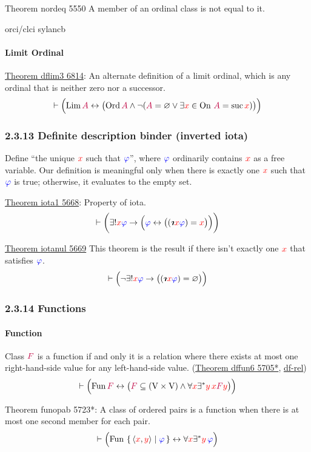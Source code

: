 \documentclass[12pt, letterpaper]{article}
\newcommand{\red}[1]{{\color{red} #1}}
\newcommand{\blue}[1]{{\color{blue} #1}}
\newcommand{\purple}[1]{{\color{purple} #1}}
\renewcommand{\emptyset}{\varnothing}
\newcommand{\provable}{\vdash}
\newcommand{\ra}{\rightarrow}
\newcommand{\lra}{\leftrightarrow}
\newcommand{\setvar}{\red}
\newcommand{\wff}{\blue}
\newcommand{\classvar}{\purple}
\newcommand{\wffphi}{\wff{\varphi}}
\newcommand{\sx}{\setvar{x}}
\newcommand{\sy}{\setvar{y}}
\newcommand{\clA}{\classvar{A}}
\newcommand{\clF}{\classvar{F}}
\newcommand{\VV}{\mathrm{V}}
\newcommand{\unique}{\exists^*}
\newcommand{\rotiota}[2]{\rotatebox[origin=c]{180}{$#1\boldsymbol{\iota}$}}
\newcommand{\iiota}{{\mathpalette\rotiota\relax}}
\newcommand{\defdes}{\iiota}
\newcommand{\Fun}{{\operatorname{Fun}\,}}
\newcommand{\Ord}{{\operatorname{Ord}\,}}
\newcommand{\suc}{{\operatorname{suc}\,}}
\newcommand{\Lim}{{\operatorname{Lim}\,}}
\newcommand{\On}{{\operatorname{On}\,}}
\newcommand{\opair}[2]{\left\langle{#1,#2}\right\rangle}
\theoremstyle{definition}
\theoremstyle{remark}
\theoremstyle{definition}
\theoremstyle{plain}
\begin{document}
	Theorem	nordeq 5550	A member of an ordinal class is not equal to it. 
	
	orci/clci
	sylancb
	\paragraph{Limit Ordinal}	
	\href{http://us.metamath.org/mpeuni/dflim3.html}
	{Theorem dflim3 6814}:
	An alternate definition of a limit ordinal, which is any ordinal that is neither zero nor a successor.
	\[\provable\Big(\Lim\clA\lra\big(\Ord\clA\land\neg(\clA=\emptyset
	\lor\exists\sx\in\On\,\clA=\suc\sx)\big)\Big) \]

	\subsubsection*{2.3.13  Definite description binder (inverted iota)}		
	
	Define ``the unique $\sx$ such that $\wffphi$'',
	where $\wffphi$ ordinarily contains $\sx$ as a free variable.
	Our definition is meaningful only when there is exactly one $\sx$
	such that $\wffphi$ is true;
	otherwise, it evaluates to the empty set.
	
	\href{http://us.metamath.org/mpeuni/iota1.html}{Theorem iota1 5668}:
	Property of iota.
	\[\provable\bigg(\exists!\sx\wffphi\ra\Big(\wffphi\lra\big((\defdes \sx\wffphi) = \sx\big)\Big)\bigg) \]
	
	\href{http://us.metamath.org/mpeuni/iotanul.html}{Theorem iotanul 5669}
	This theorem is the result if there isn't exactly one $\sx$
	that satisfies $\wffphi$.
	\[\provable\Big( \neg\exists!\sx\wffphi\ra \big((\defdes\sx\wffphi)=\emptyset\big) \Big) \]
	
	\subsubsection*{2.3.14  Functions}
	\paragraph{Function}
	Class $\clF$ is a function if and only it is a relation
	where there exists at most one right-hand-side value for any left-hand-side value.
	(\href{http://us.metamath.org/mpeuni/mmtheorems58.html}{Theorem dffun6 5705*},
	\href{http://us.metamath.org/mpeuni/df-rel.html}{df-rel})
	\[\provable\Big(\Fun\clF\lra\big(\clF\subseteq(\VV\times\VV)\land\forall\sx\unique\sy\,\sx\clF\sy\big)\Big) \]

	Theorem funopab 5723*: A class of ordered pairs is a function when there is at most one second member for each pair.
	\[\provable \Big(\Fun\set{\opair{\sx}{\sy}|\wffphi}\lra\forall\sx\unique\sy\,\wffphi\Big)\]
	
\end{document}
